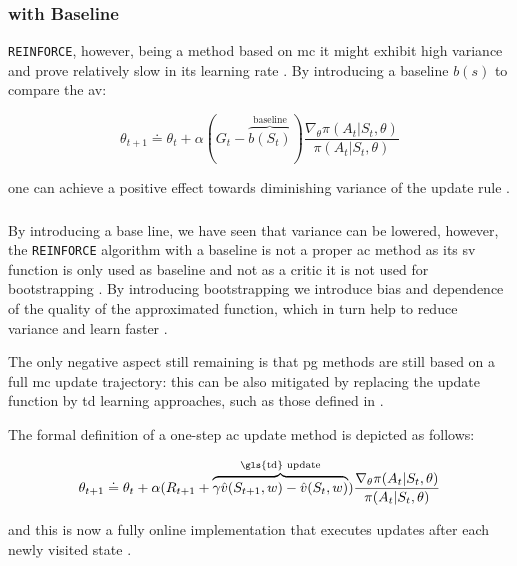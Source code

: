 \subsubsection{ with Baseline}

\texttt{REINFORCE}, however, being a method based on \gls{mc} it might exhibit high variance and prove relatively slow in its learning rate \citep[p. 271]{Sutton2017}. By introducing a baseline $b(s)$ to compare the \gls{av}:

\begin{equation}
	\theta_{t+1} \doteq \theta_t + \alpha (G_t - \overbrace{b(S_t)}^{\text{baseline}}) \frac{\nabla_\theta \pi(A_t|S_t,\theta)}{\pi(A_t|S_t,\theta)}
\end{equation}

one can achieve a positive effect towards diminishing variance of the update rule \citep[p. 271]{Sutton2017}.

\subsubsection{ }

By introducing a base line, we have seen that variance can be lowered, however, the \texttt{REINFORCE} algorithm with a baseline is not a proper \gls{ac} method as its \gls{sv} function is only used as baseline and not as a critic \ie it is not used for bootstrapping \citep[p. 273]{Sutton2017}. By introducing bootstrapping we introduce bias and dependence of the quality of the approximated function, which in turn help to reduce variance and learn faster \citep[p. 273]{Sutton2017}. 

The only negative aspect still remaining is that \gls{pg} methods are still based on a full \gls{mc} update trajectory: this can be also mitigated by replacing the update function by \gls{td} learning approaches, such as those defined in  \citep[p. 273]{Sutton2017}.

The formal definition of a one-step \gls{ac} update method is depicted as follows:

\begin{equation}
	\theta_{t+1} \doteq \theta_t + \alpha(R_{t+1} + \overbrace{\gamma \hat{v}(S_{t+1},w)-\hat{v}(S_t,w)}^{\text{\gls{td} update}}) \frac{\nabla_\theta \pi(A_t|S_t,\theta)}{\pi(A_t|S_t,\theta)}
\end{equation}

and this is now a fully online implementation that executes updates after each newly visited state \citep[p. 274]{Sutton2017}. 

